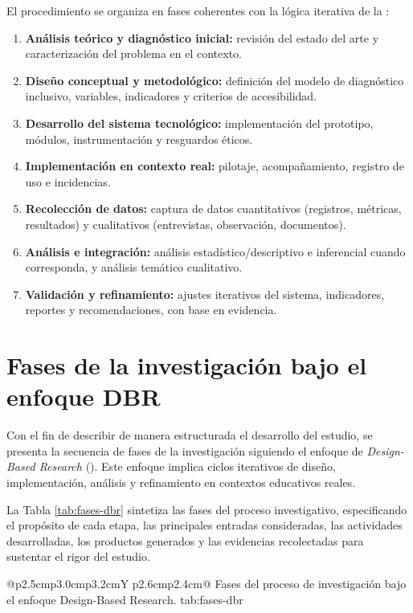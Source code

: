 \begin{refsection}
El procedimiento se organiza en fases coherentes con la lógica iterativa de la \DBR:

\begin{enumerate}
\item \textbf{Análisis teórico y diagnóstico inicial:} revisión del estado del arte y caracterización del problema en el contexto.
\item \textbf{Diseño conceptual y metodológico:} definición del modelo de diagnóstico inclusivo, variables, indicadores y criterios de accesibilidad.
\item \textbf{Desarrollo del sistema tecnológico:} implementación del prototipo, módulos, instrumentación y resguardos éticos.
\item \textbf{Implementación en contexto real:} pilotaje, acompañamiento, registro de uso e incidencias.
\item \textbf{Recolección de datos:} captura de datos cuantitativos (registros, métricas, resultados) y cualitativos (entrevistas, observación, documentos).
\item \textbf{Análisis e integración:} análisis estadístico/descriptivo e inferencial cuando corresponda, y análisis temático cualitativo.
\item \textbf{Validación y refinamiento:} ajustes iterativos del sistema, indicadores, reportes y recomendaciones, con base en evidencia.
\end{enumerate}
\section{Fases de la investigación bajo el enfoque DBR}

Con el fin de describir de manera estructurada el desarrollo del estudio, se presenta la secuencia de fases de la investigación siguiendo el enfoque de \textit{Design-Based Research} (\DBR). Este enfoque implica ciclos iterativos de diseño, implementación, análisis y refinamiento en contextos educativos reales.

La Tabla \ref{tab:fases-dbr} sintetiza las fases del proceso investigativo, especificando el propósito de cada etapa, las principales entradas consideradas, las actividades desarrolladas, los productos generados y las evidencias recolectadas para sustentar el rigor del estudio.

\begin{APAlongtable}
{@{}p{2.5cm}p{3.0cm}p{3.2cm}Y p{2.6cm}p{2.4cm}@{}}
{Fases del proceso de investigación bajo el enfoque Design-Based Research.}
{tab:fases-dbr}


\end{APAlongtable}
\end{refsection}
